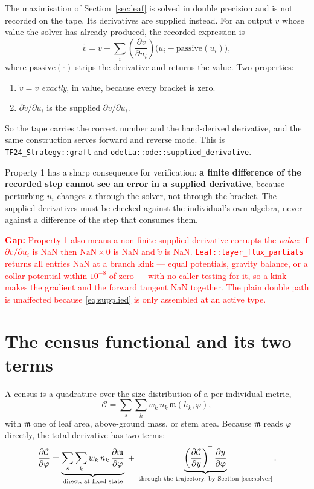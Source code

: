 \documentclass[11pt,a4paper]{article}
\newcommand{\code}[1]{\texttt{\small #1}}
\newcommand{\dd}[2]{\frac{\partial #1}{\partial #2}}
\newcommand{\gap}[1]{\textcolor{red}{\textbf{Gap:} #1}}
\begin{document}
The maximisation of Section~\ref{sec:leaf} is solved in double precision and is
not recorded on the tape. Its derivatives are supplied instead. For an output
$v$ whose value the solver has already produced, the recorded expression is
\begin{equation}
\tilde{v} = v + \sum_i \left(\dd{v}{u_i}\right)
\big(u_i - \mathrm{passive}(u_i)\big),
\label{eq:supplied}
\end{equation}
where $\mathrm{passive}(\cdot)$ strips the derivative and returns the value. Two
properties:
\begin{enumerate}
\item $\tilde{v} = v$ \emph{exactly}, in value, because every bracket is zero.
\item $\partial \tilde v/\partial u_i$ is the supplied $\partial v/\partial u_i$.
\end{enumerate}
So the tape carries the correct number and the hand-derived derivative, and the
same construction serves forward and reverse mode. This is
\code{TF24\_Strategy::graft} and \code{odelia::ode::supplied\_derivative}.

Property 1 has a sharp consequence for verification: \textbf{a finite difference
of the recorded step cannot see an error in a supplied derivative}, because
perturbing $u_i$ changes $v$ through the solver, not through the bracket. The
supplied derivatives must be checked against the individual's own algebra, never
against a difference of the step that consumes them.

\gap{Property 1 also means a non-finite supplied derivative corrupts the
\emph{value}: if $\partial v/\partial u_i$ is NaN then $\mathrm{NaN} \times 0$ is
NaN and $\tilde v$ is NaN. \code{Leaf::layer\_flux\_partials} returns all entries
NaN at a branch kink --- equal potentials, gravity balance, or a collar potential
within $10^{-8}$ of zero --- with no caller testing for it, so a kink makes the
gradient and the forward tangent NaN together. The plain double path is unaffected
because \eqref{eq:supplied} is only assembled at an active type.}

\section{The census functional and its two terms}
\label{sec:census}

A census is a quadrature over the size distribution of a per-individual metric,
\begin{equation}
\mathcal{C} = \sum_s \sum_k w_k \, n_k \, \mathfrak{m}(h_k, \varphi),
\label{eq:census}
\end{equation}
with $\mathfrak{m}$ one of leaf area, above-ground mass, or stem area. Because
$\mathfrak{m}$ reads $\varphi$ directly, the total derivative has two terms:
\begin{equation}
\dd{\mathcal{C}}{\varphi}
= \underbrace{\sum_s \sum_k w_k \, n_k \, \dd{\mathfrak{m}}{\varphi}}
  _{\text{direct, at fixed state}}
\;+\;
\underbrace{\left(\dd{\mathcal{C}}{y}\right)^{\!\top}
  \dd{y}{\varphi}}_{\text{through the trajectory, by Section~\ref{sec:solver}}} .
\label{eq:censustwo}
\end{equation}
\end{document}
